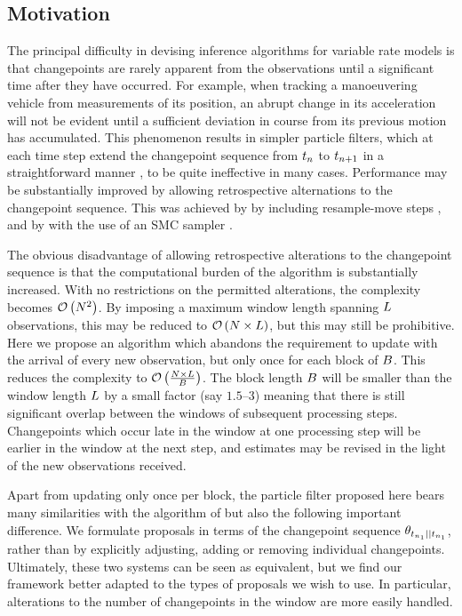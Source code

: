 \documentclass{article}
\begin{document}
\subsection{Motivation}

The principal difficulty in devising inference algorithms for variable rate models is that changepoints are rarely apparent from the observations until a significant time after they have occurred. For example, when tracking a manoeuvering vehicle from measurements of its position, an abrupt change in its acceleration will not be evident until a sufficient deviation in course from its previous motion has accumulated. This phenomenon results in simpler particle filters, which at each time step extend the changepoint sequence from $t_{n}$ to $t_{n+1}$ in a straightforward manner \citep{Godsill2004a,Godsill2007}, to be quite ineffective in many cases. Performance may be substantially improved by allowing retrospective alternations to the changepoint sequence. This was achieved by \citet{Bunch2012a} by including resample-move steps \citep{Gilks2001}, and by \cite{Whiteley2011} with the use of an SMC sampler \cite{DelMoral2006,Doucet2006}.

The obvious disadvantage of allowing retrospective alterations to the changepoint sequence is that the computational burden of the algorithm is substantially increased. With no restrictions on the permitted alterations, the complexity becomes $\mathcal{O}\left({N^2}\right)$. By imposing a maximum window length spanning $L$ observations, this may be reduced to $\mathcal{O}\left({N \times L}\right)$, but this may still be prohibitive. Here we propose an algorithm which abandons the requirement to update with the arrival of every new observation, but only once for each block of $B$. This reduces the complexity to $\mathcal{O}\left({\frac{N \times L}{B}}\right)$. The block length $B$ will be smaller than the window length $L$ by a small factor (say $1.5$--$3$) meaning that there is still significant overlap between the windows of subsequent processing steps. Changepoints which occur late in the window at one processing step will be earlier in the window at the next step, and estimates may be revised in the light of the new observations received.

Apart from updating only once per block, the particle filter proposed here bears many similarities with the algorithm of \citet{Whiteley2011} but also the following important difference. We formulate proposals in terms of the changepoint sequence $\cp[\ot{\ti_1}]{\ot{\ti_1}}$, rather than by explicitly adjusting, adding or removing individual changepoints. Ultimately, these two systems can be seen as equivalent, but we find our framework better adapted to the types of proposals we wish to use. In particular, alterations to the number of changepoints in the window are more easily handled.
\end{document}
